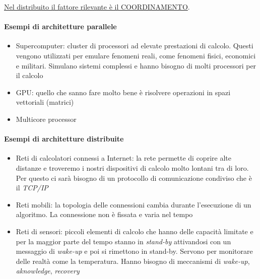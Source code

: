 \uline{Nel distribuito il fattore rilevante è il COORDINAMENTO}.

\paragraph{Esempi di architetture parallele}
\begin{itemize}
    \item Supercomputer: cluster di processori ad elevate prestazioni di calcolo. Questi vengono utilizzati per emulare fenomeni reali, come fenomeni fisici, economici e militari. Simulano sistemi complessi e hanno bisogno di molti processori per il calcolo
    \item GPU: quello che sanno fare molto bene è risolvere operazioni in spazi vettoriali (matrici)
    \item Multicore processor
\end{itemize}

\paragraph{Esempi di architetture distribuite}
\begin{itemize}
    \item Reti di calcolatori connessi a Internet: la rete permette di coprire alte distanze e troveremo i nostri dispositivi di calcolo molto lontani tra di loro. Per questo ci sarà bisogno di un protocollo di comunicazione condiviso che è il \textit{TCP/IP}
    \item Reti mobili: la topologia delle connessioni cambia durante l'esecuzione di un algoritmo. La connessione non è fissata e varia nel tempo
    \item Reti di sensori: piccoli elementi di calcolo che hanno delle capacità limitate e per la maggior parte del tempo stanno in \textit{stand-by} attivandosi con un messaggio di \textit{wake-up} e poi si rimettono in stand-by. Servono per monitorare delle realtà come la temperatura. Hanno bisogno di meccanismi di \textit{wake-up}, \textit{aknowledge}, \textit{recovery}
\end{itemize}

\newpage
